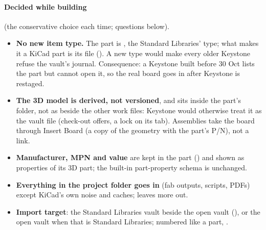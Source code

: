 \paragraph{Decided while building} (the conservative choice each time; questions below).
\begin{itemize}[nosep]
  \item \textbf{No new item type.} The part is , the Standard Libraries' type; what makes it a KiCad part is
        its file (). A new  type would make every older Keystone refuse the vault's
        journal. Consequence: a Keystone built before 30 Oct lists the part but cannot open it, so the real board goes
        in after Keystone is restaged.
  \item \textbf{The 3D model is derived, not versioned}, and sits inside the part's folder, not as 
        beside the other work files: Keystone would otherwise treat it as the vault file (check-out offers, a lock
        on its tab). Assemblies take the board through Insert Board (a copy of the geometry with the part's P/N), not
        a link.
  \item \textbf{Manufacturer, MPN and value} are kept in the part () and shown as
        properties of its 3D part; the built-in part-property schema is unchanged.
  \item \textbf{Everything in the project folder goes in} (fab outputs, scripts, PDFs) except KiCad's own noise and
        caches;  leaves more out.
  \item \textbf{Import target}: the Standard Libraries vault beside the open vault (),
        or the open vault when that is Standard Libraries; numbered like a part, .
\end{itemize}


